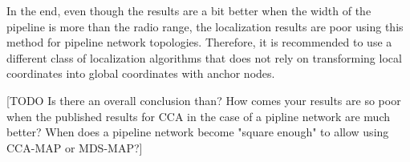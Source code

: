 In the end, even though the results are a bit better when the width of the pipeline is more than the radio range, the localization results are poor using this method for pipeline network topologies.  Therefore, it is recommended to use a different class of localization algorithms that does not rely on transforming local coordinates into global coordinates with anchor nodes.

[TODO Is there an overall conclusion than? How comes your results are so poor when the published results for CCA in the case of a pipline network are much better? When does a pipeline network become "square enough" to allow using CCA-MAP or MDS-MAP?]
